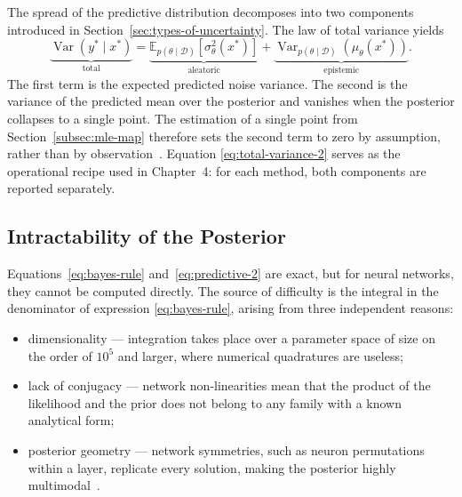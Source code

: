 The spread of the predictive distribution decomposes into two components introduced in
Section~\ref{sec:types-of-uncertainty}. The law of total variance yields
%
\begin{equation}
    \underbrace{\operatorname{Var}\!\left(y^\ast \mid x^\ast\right)}_{\text{total}}
    =
    \underbrace{\mathbb{E}_{p(\theta \mid \mathcal{D})}
      \!\left[\sigma^2_\theta(x^\ast)\right]}_{\text{aleatoric}}
    +
    \underbrace{\operatorname{Var}_{p(\theta \mid \mathcal{D})}
      \!\left(\mu_\theta(x^\ast)\right)}_{\text{epistemic}} .
    \label{eq:total-variance-2}
\end{equation}
%
The first term is the expected predicted noise variance. The second is the variance of the
predicted mean over the posterior and vanishes when the posterior collapses to a single
point. The estimation of a single point from Section~\ref{subsec:mle-map} therefore sets the second term to zero by assumption, rather than by observation~\cite{hullermeier2021}. Equation
\eqref{eq:total-variance-2} serves as the operational recipe used in Chapter~4: for each
method, both components are reported separately.

\subsection{Intractability of the Posterior}
\label{subsec:intractability}

Equations~\eqref{eq:bayes-rule} and~\eqref{eq:predictive-2} are exact, but for neural
networks, they cannot be computed directly. The source of difficulty is the integral in the
denominator of expression \eqref{eq:bayes-rule}, arising from three independent reasons:

\begin{itemize}
    \item dimensionality --- integration takes place over a parameter space of size
          on the order of $10^5$ and larger, where numerical quadratures are useless;
    \item lack of conjugacy --- network non-linearities mean that the product of the
          likelihood and the prior does not belong to any family with a known analytical
          form;
    \item posterior geometry --- network symmetries, such as neuron permutations within a
          layer, replicate every solution, making the posterior highly
          multimodal~\cite{jospin2022}.
\end{itemize}

